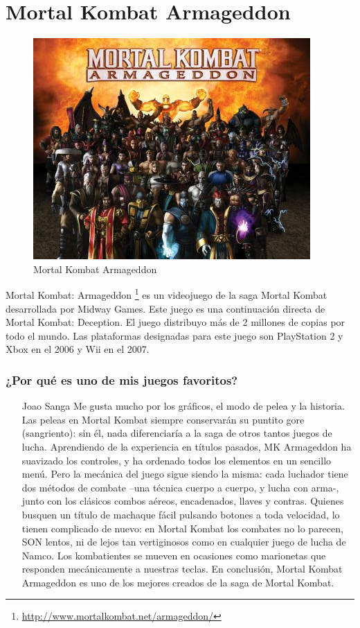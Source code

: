 \section{Mortal Kombat Armageddon}

\begin{figure}[htbp]
\begin{center}
\includegraphics[width=.60\textwidth]{./imagenes/MortalK.jpg}
\caption{Mortal Kombat Armageddon}
\label{Mortal Kombat Armageddon}
\end{center}
\end{figure}

Mortal Kombat: Armageddon \footnote{\url{http://www.mortalkombat.net/armageddon/}} es un videojuego de la saga Mortal Kombat desarrollada por Midway Games. Este juego es una continuación directa de Mortal Kombat: Deception. El juego distribuyo más de 2 millones de copias por todo el mundo.
Las plataformas designadas para este juego son PlayStation 2 y Xbox en el 2006 y Wii en el 2007.

\subsubsection{¿Por qué es uno de mis juegos favoritos?}
\begin{itemize}
\item[Joao Sanga] Me gusta mucho por los gráficos, el modo de pelea y la historia. Las peleas en Mortal Kombat siempre conservarán su puntito gore (sangriento): sin él, nada diferenciaría a la saga de otros tantos juegos de lucha.
Aprendiendo de la experiencia en títulos pasados, MK Armageddon ha suavizado los controles, y ha ordenado todos los elementos en un sencillo menú. Pero la mecánica del juego sigue siendo la misma: cada luchador tiene dos métodos de combate –una técnica cuerpo a cuerpo, y lucha con arma-, junto con los clásicos combos aéreos, encadenados, llaves y contras. Quienes busquen un título de machaque fácil pulsando botones a toda velocidad, lo tienen complicado de nuevo: en Mortal Kombat los combates no lo parecen, SON lentos, ni de lejos tan vertiginosos como en cualquier juego de lucha de Namco. Los kombatientes se mueven en ocasiones como marionetas que responden mecánicamente a nuestras teclas.
En conclusión, Mortal Kombat Armageddon es uno de los mejores creados de la saga de Mortal Kombat.
\end{itemize}